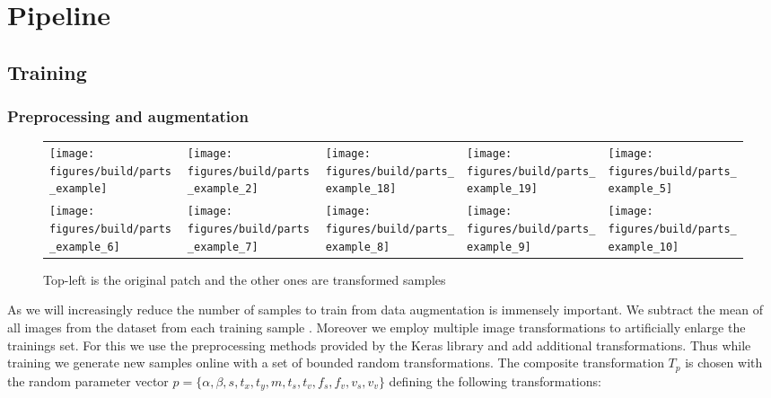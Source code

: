 %
\chapter{Pipeline}
\label{sec:pipeline}

\section{Training}
\label{sec:pipeline:training}
\subsection{Preprocessing and augmentation}
\label{sec:pipeline:training:augment}
\begin{figure}[htb]
    \begin{tabularx}{\textwidth}{XXXXX}
        \texttt{[image: figures/build/parts\_example]} &
        \texttt{[image: figures/build/parts\_example\_2]} &
        \texttt{[image: figures/build/parts\_example\_18]} &
        \texttt{[image: figures/build/parts\_example\_19]} &
        \texttt{[image: figures/build/parts\_example\_5]} \\

        \texttt{[image: figures/build/parts\_example\_6]} &
        \texttt{[image: figures/build/parts\_example\_7]} &
        \texttt{[image: figures/build/parts\_example\_8]} &
        \texttt{[image: figures/build/parts\_example\_9]} &
        \texttt{[image: figures/build/parts\_example\_10]}
    \end{tabularx}
	\caption{Top-left is the original patch and the other ones are transformed samples}
    \label{fig:augmentation}
\end{figure}
As we will increasingly reduce the number of samples to train from data augmentation is immensely important. We subtract the mean of all images from the dataset from each training sample \citep{krizhevsky_imagenet_2012}. Moreover we employ multiple image transformations to artificially enlarge the trainings set. For this we use the preprocessing methods provided by the Keras library \citep{chollet_keras:_2015} and add additional transformations. Thus while training we generate new samples online with a set of bounded random transformations. The composite transformation $T_p$ is chosen with the random parameter vector $p = \{\alpha, \beta, s, t_x, t_y, m, t_s, t_v, f_s, f_v, v_s, v_v\}$ defining the following transformations:
